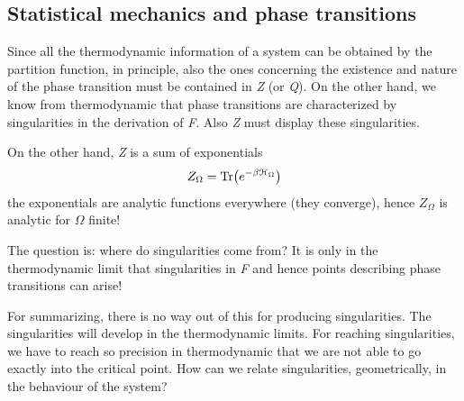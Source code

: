 \documentclass[../main/main.tex]{subfiles}
\begin{document}
\subsection{Statistical mechanics and phase transitions}
Since all the thermodynamic information of a system can be obtained by the partition function, in principle, also the ones concerning the existence and nature of the phase transition must be contained in \emph{Z} (or \emph{Q}). On the other hand, we know from thermodynamic that phase transitions are characterized by singularities in the derivation of \emph{F}. Also \emph{Z} must display these singularities.

On the other hand, \emph{Z} is a sum of exponentials
\begin{equation}
  Z_ \Omega = \Tr(e^{-\beta \mathcal{H}_ \Omega } )
\end{equation}
the exponentials are analytic functions everywhere (they converge), hence \( Z_ \Omega  \) is analytic for \( \Omega  \) finite!

The question is: where do singularities come from?
It is only in the thermodynamic limit that singularities in \emph{F} and hence points describing phase transitions can arise!

For summarizing, there is no way out of this for producing singularities. The singularities will develop in the thermodynamic limits. For reaching singularities, we have to reach so precision in thermodynamic that we are not able to go exactly into the critical point. How can we relate singularities, geometrically, in the behaviour of the system?
\end{document}
